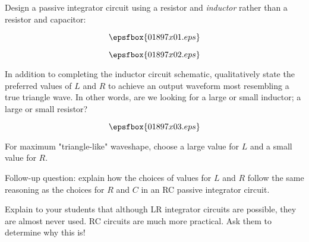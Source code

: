 

Design a passive integrator circuit using a resistor and {\it inductor} rather than a resistor and capacitor:

$$\epsfbox{01897x01.eps}$$

$$\epsfbox{01897x02.eps}$$

In addition to completing the inductor circuit schematic, qualitatively state the preferred values of $L$ and $R$ to achieve an output waveform most resembling a true triangle wave.  In other words, are we looking for a large or small inductor; a large or small resistor?







$$\epsfbox{01897x03.eps}$$

For maximum "triangle-like" waveshape, choose a large value for $L$ and a small value for $R$.

\vskip 10pt

Follow-up question: explain how the choices of values for $L$ and $R$ follow the same reasoning as the choices for $R$ and $C$ in an RC passive integrator circuit.







Explain to your students that although LR integrator circuits are possible, they are almost never used.  RC circuits are much more practical.  Ask them to determine why this is!




